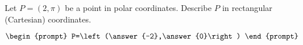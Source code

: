 \documentclass{ximera}
\author{Gregory Hartman \and Matthew Carr}
\begin{document}
\begin{exercise}





Let $P=(2,\pi)$ be a point in polar coordinates. Describe $P$ in rectangular (Cartesian) coordinates.

\[
\begin{prompt}
P=\left(\answer{-2},\answer{0}\right)
\end{prompt}
\]

\end{exercise}
\end{document}
